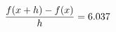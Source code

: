 \documentclass[preview]{standalone}
\begin{document}
\begin{align*}
\special{dvisvgm:raw <g id='unique000'>}\frac{f(x+h)-f(x)}{h} = 6.037\special{dvisvgm:raw </g>}
\end{align*}
\end{document}
